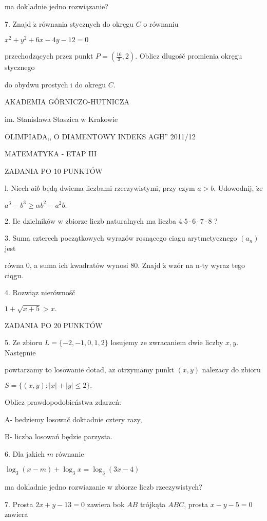 \documentclass[a4paper,12pt]{article}
\begin{document}
ma dokladnie jedno rozwiązanie?

7. Znajd $\acute{\mathrm{z}}$ równania stycznych do okręgu $C$ o równaniu

$x^{2}+y^{2}+6x-4y-12=0$

przechodzących przez punkt $P=(\displaystyle \frac{16}{3},2)$. Oblicz dlugośč promienia okręgu stycznego

do obydwu prostych i do okregu $C.$






AKADEMIA GÓRNICZO-HUTNICZA

im. StanisIawa Staszica w Krakowie

OLIMPIADA,, O DIAMENTOWY INDEKS AGH'' 2011/12

MATEMATYKA - ETAP III

ZADANIA PO 10 PUNKTÓW

l. Niech $a\mathrm{i}b$ będą dwiema liczbami rzeczywistymi, przy czym $a>b$. Udowodnij, $\dot{\mathrm{z}}\mathrm{e}$

$a^{3}-b^{3}\geq\alpha b^{2}-a^{2}b.$

2. Ile dzielników w zbiorze liczb naturalnych ma liczba 4$\cdot 5\cdot 6\cdot 7\cdot 8$ ?

3. Suma czterech początkowych wyrazów rosnącego ciagu arytmetycznego $(a_{n})$ jest

równa 0, a suma ich kwadratów wynosi 80. Znajd $\acute{\mathrm{z}}$ wzór na n-ty wyraz tego ciqgu.

4. Rozwiąz nierównośč

$1+\sqrt{x+5}>x.$

ZADANIA PO 20 PUNKTÓW

5. Ze zbioru $L=\{-2,-1,0,1,2\}$ losujemy ze zwracaniem dwie liczby $x, y$. Następnie

powtarzamy to losowanie dotad, $\mathrm{a}\dot{\mathrm{z}}$ otrzymamy punkt $(x,y)$ nalezacy do zbioru

$S=\{(x,y):|x|+|y|\leq 2\}.$

Oblicz prawdopodobieństwa zdarzeń:

A- bedziemy losowač doktadnie cztery razy,

B- liczba losowań będzie parzysta.

6. Dla jakich $m$ równanie

$\log_{3}(x-m)+\log_{3}x=\log_{3}(3x-4)$

ma dokladnie jedno rozwiazanie w zbiorze liczb rzeczywistych?

7. Prosta $2x+y-13=0$ zawiera bok $AB$ trójkąta $ABC$, prosta $x-y-5=0$ zawiera
\end{document}
